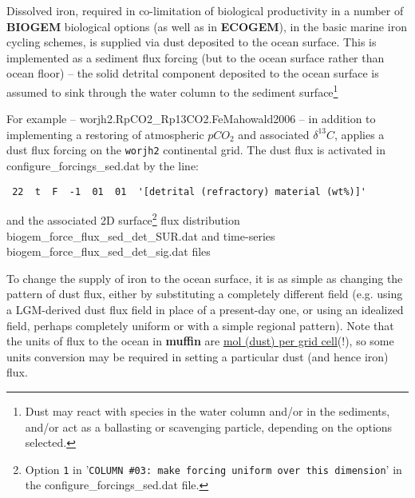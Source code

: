 Dissolved iron, required in co-limitation of biological productivity in a number of \textbf{BIOGEM} biological options (as well as in \textbf{ECOGEM}), in the basic marine iron cycling schemes, is supplied via dust deposited to the ocean surface. This is implemented as a sediment flux forcing (but to the ocean surface rather than ocean floor) -- the solid detrital component deposited to the ocean surface is assumed to sink through the water column to the sediment surface\footnote{Dust may react with species in the water column and/or in the sediments, and/or act as a ballasting or scavenging particle, depending on the options selected.} 

For example -- \textsf{\footnotesize worjh2.RpCO2\_Rp13CO2.FeMahowald2006} -- in addition to implementing a restoring of atmospheric \(pCO_{2}\) and associated \(\delta ^{13}C\), applies a dust flux forcing on the \texttt{worjh2} continental grid. The dust flux is activated in \textsf{\footnotesize configure\_forcings\_sed.dat} by the line:
\vspace{-1mm}\begin{verbatim}
 22  t  F  -1  01  01  '[detrital (refractory) material (wt%)]'
\end{verbatim}\vspace{-1mm}
and the associated 2D surface\footnote{Option \texttt{1} in '\texttt{COLUMN \#03: make forcing uniform over this dimension}' in the \textsf{\scriptsize configure\_forcings\_sed.dat} file.} flux distribution \textsf{\footnotesize biogem\_force\_flux\_sed\_det\_SUR.dat} and time-series \textsf{\footnotesize biogem\_force\_flux\_sed\_det\_sig.dat} files

To change the supply of iron to the ocean surface, it is as simple as changing the pattern of dust flux, either by substituting a completely different field (e.g. using a LGM-derived dust flux field in place of a present-day one, or using an idealized field, perhaps completely uniform or with a simple regional pattern). Note that the units of flux to the ocean in \textbf{muffin} are \uline{mol (dust) per grid cell}(!), so some units conversion may be required in setting a particular dust (and hence iron) flux.

